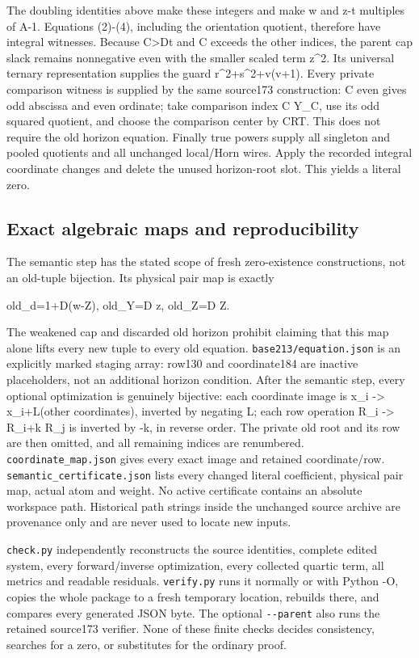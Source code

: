 The doubling identities above make these integers and make w and z-t
multiples of A-1. Equations (2)-(4), including the orientation quotient,
therefore have integral witnesses. Because C\textgreater Dt and C
exceeds the other indices, the parent cap slack remains nonnegative even
with the smaller scaled term z\^{}2. Its universal ternary
representation supplies the guard r\^{}2+s\^{}2+v(v+1). Every private
comparison witness is supplied by the same source173 construction: C
even gives odd abscissa and even ordinate; take comparison index C Y\_C,
use its odd squared quotient, and choose the comparison center by CRT.
This does not require the old horizon equation. Finally true powers
supply all singleton and pooled quotients and all unchanged local/Horn
wires. Apply the recorded integral coordinate changes and delete the
unused horizon-root slot. This yields a literal zero.

\subsection{Exact algebraic maps and
reproducibility}\label{exact-algebraic-maps-and-reproducibility}

The semantic step has the stated scope of fresh zero-existence
constructions, not an old-tuple bijection. Its physical pair map is
exactly

old\_d=1+D(w-Z), old\_Y=D z, old\_Z=D Z.

The weakened cap and discarded old horizon prohibit claiming that this
map alone lifts every new tuple to every old equation.
\texttt{base213/equation.json} is an explicitly marked staging array:
row130 and coordinate184 are inactive placeholders, not an additional
horizon condition. After the semantic step, every optional optimization
is genuinely bijective: each coordinate image is x\_i -\textgreater{}
x\_i+L(other coordinates), inverted by negating L; each row operation
R\_i -\textgreater{} R\_i+k R\_j is inverted by -k, in reverse order.
The private old root and its row are then omitted, and all remaining
indices are renumbered. \texttt{coordinate\_map.json} gives every exact
image and retained coordinate/row. \texttt{semantic\_certificate.json}
lists every changed literal coefficient, physical pair map, actual atom
and weight. No active certificate contains an absolute workspace path.
Historical path strings inside the unchanged source archive are
provenance only and are never used to locate new inputs.

\texttt{check.py} independently reconstructs the source identities,
complete edited system, every forward/inverse optimization, every
collected quartic term, all metrics and readable residuals.
\texttt{verify.py} runs it normally or with Python -O, copies the whole
package to a fresh temporary location, rebuilds there, and compares
every generated JSON byte. The optional \texttt{-\/-parent} also runs
the retained source173 verifier. None of these finite checks decides
consistency, searches for a zero, or substitutes for the ordinary proof.
